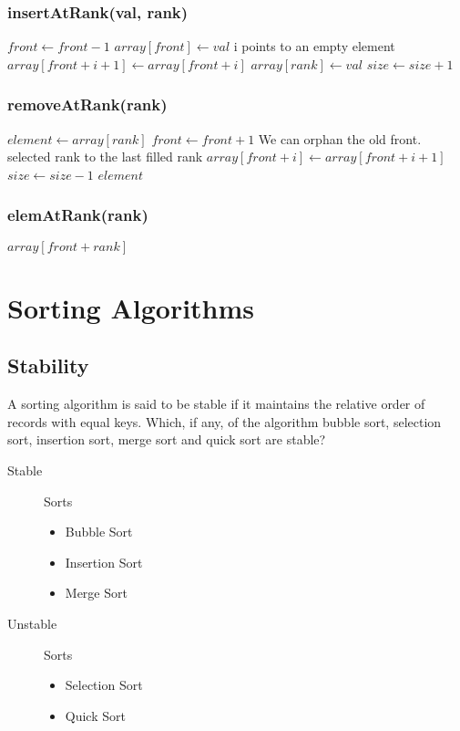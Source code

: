 \documentclass[12pt]{article}
\begin{document}
\subsubsection{insertAtRank(val, rank)}
		\begin{algorithmic}
				\State $ front \gets front -1 $
				\State $ array[front] \gets val $
			\Else
				\Comment i points to an empty element
					\State $ array[front+i+1] \gets array[front+i] $
				\EndFor
				\State $ array[rank] \gets val $
			\EndIf
			\State $ size \gets size + 1$
		\end{algorithmic}
\subsubsection{removeAtRank(rank)}
		\begin{algorithmic}
			\State $ element \gets array[rank] $
			\If{$ rank = 0 $}
				\State $ front \gets front + 1 $
				\Comment We can orphan the old front.
			\Else
				\For{$ i \gets rank $; $ i < size-1 $; $ i++ $;}
				\State \Comment selected rank to the last filled rank
					\State $ array[front+i] \gets array[front+i+1] $
				\EndFor
			\EndIf
			\State $ size \gets size - 1$
			\State \Return $element$
		\end{algorithmic}
\subsubsection{elemAtRank(rank)}
	\begin{algorithmic}
		\State \Return $ array[front+rank] $
	\end{algorithmic}


\section{Sorting Algorithms}
\subsection{Stability}
A sorting algorithm is said to be stable if it maintains the relative order of records with equal keys. Which, if any, of the algorithm bubble sort, selection sort, insertion sort, merge sort and quick sort are stable?
\begin{description}
	\item[Stable] Sorts
	\begin{itemize}
		\item Bubble Sort
		\item Insertion Sort
		\item Merge Sort
	\end{itemize}
	\item[Unstable] Sorts
	\begin{itemize}
		\item Selection Sort
		\item Quick Sort
	\end{itemize}
\end{description}
\end{document}
